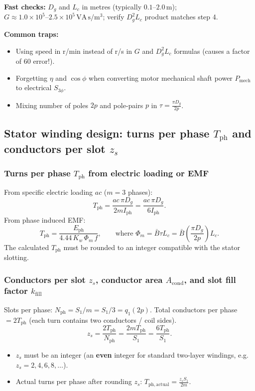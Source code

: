 \textbf{Fast checks:} $D_g$ and $L_c$ in metres (typically $0.1\text{--}2.0\,\mathrm{m}$); $G \approx 1.0\times 10^5\text{--}2.5\times 10^5\,\mathrm{VA\,s/m^3}$; verify $D_g^2 L_c$ product matches step 4.

\textbf{Common traps:}
\begin{itemize}
  \item Using speed in r/min instead of r/s in $G$ and $D_g^2 L_c$ formulas (causes a factor of 60 error!).
  \item Forgetting $\eta$ and $\cos\phi$ when converting motor mechanical shaft power $P_{\mathrm{mech}}$ to electrical $S_{3\phi}$.
  \item Mixing number of poles $2p$ and pole-pairs $p$ in $\tau = \frac{\pi D_g}{2p}$.
\end{itemize}

\subsection{Stator winding design: turns per phase $T_{\mathrm{ph}}$ and conductors per slot $z_s$}
\subsubsection{Turns per phase $T_{\mathrm{ph}}$ from electric loading or EMF}
From specific electric loading $ac$ ($m=3$ phases):
\[
\boxed{T_{\mathrm{ph}} = \frac{ac\,\pi D_g}{2 m I_{\mathrm{ph}}} = \frac{ac\,\pi D_g}{6 I_{\mathrm{ph}}}}.
\]
From phase induced EMF:
\[
\boxed{T_{\mathrm{ph}} = \frac{E_{\mathrm{ph}}}{4.44\,K_w\,\Phi_m\,f}},
\qquad\text{where }\Phi_m = \bar{B}\tau L_c = \bar{B}\left(\frac{\pi D_g}{2p}\right)L_c.
\]
The calculated $T_{\mathrm{ph}}$ must be rounded to an integer compatible with the stator slotting.

\subsubsection{Conductors per slot $z_s$, conductor area $A_{\mathrm{cond}}$, and slot fill factor $k_{\mathrm{fill}}$}
Slots per phase: $N_{\mathrm{ph}} = S_1 / m = S_1 / 3 = q_1 (2p)$.
Total conductors per phase $= 2 T_{\mathrm{ph}}$ (each turn contains two conductors / coil sides).
\[
\boxed{z_s = \frac{2 T_{\mathrm{ph}}}{N_{\mathrm{ph}}} = \frac{2 m T_{\mathrm{ph}}}{S_1} = \frac{6 T_{\mathrm{ph}}}{S_1}}.
\]
\begin{itemize}
  \item $z_s$ must be an integer (an \textbf{even} integer for standard two-layer windings, e.g.\ $z_s = 2, 4, 6, 8, \dots$).
  \item Actual turns per phase after rounding $z_s$: $T_{\mathrm{ph,actual}} = \frac{z_s S_1}{2 m}$.
\end{itemize}

